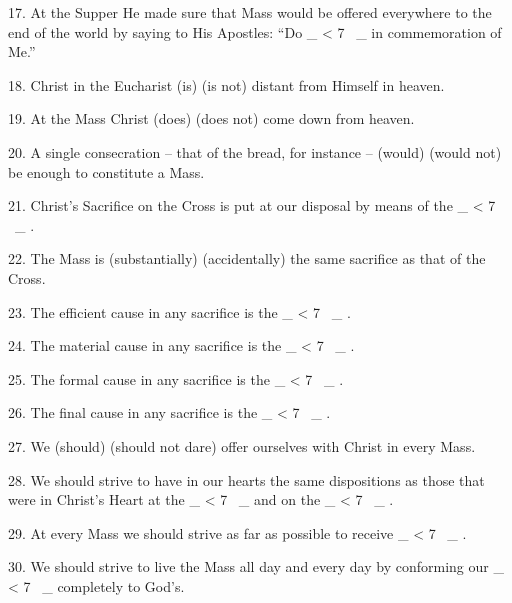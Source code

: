 \documentclass[a5paper]{article}
\newcommand\textjarman[1]{{\jarman #1}}
\newcounter{z}
\newcommand\spaces[1]{ \_\loop \ifnum\value{z} < #1
~\_%
\stepcounter{z}%
\repeat%
\setcounter{z}{0}}
\begin{document}
17.  At  the
Supper He made sure that Mass would be offered everywhere to the end of  the
world by saying to His Apostles: “Do \spaces{7} in commemoration of  Me.”  

18. Christ in the Eucharist (\textjarman{is}) (\textjarman{is not}) distant from Himself  in  heaven.  

19. At the Mass Christ (\textjarman{does}) (\textjarman{does not}) come down from  heaven.  

20.  A  single
consecration – that of the bread, for instance  –  (\textjarman{would})  (\textjarman{would  not})  be
enough to constitute a Mass. 

21. Christ's Sacrifice on the Cross is  put  at
our disposal by means of the  \spaces{7}.  

22.  The  Mass  is  (\textjarman{substantially})
(\textjarman{accidentally}) the same sacrifice as that of the Cross.  

23.  The  efficient
cause in any sacrifice is the  \spaces{7}.  

24.  The  material  cause  in  any
sacrifice is the \spaces{7}. 

25. The formal cause  in  any  sacrifice  is  the
\spaces{7}. 

26. The final cause in any  sacrifice  is  the  \spaces{7}.  

27.  We
(\textjarman{should}) (\textjarman{should not dare}) offer ourselves with Christ in  every  Mass.  

28. We should strive to have in our hearts the same dispositions as  those  that
were in Christ's Heart at the \spaces{7} and on the  \spaces{7}.  

29.  At  every
Mass we should strive as far as possible to receive \spaces{7}. 

30. We  should
strive to live the Mass all day and every day  by  conforming  our  \spaces{7}
completely to God's.



\newpage
\end{document}
